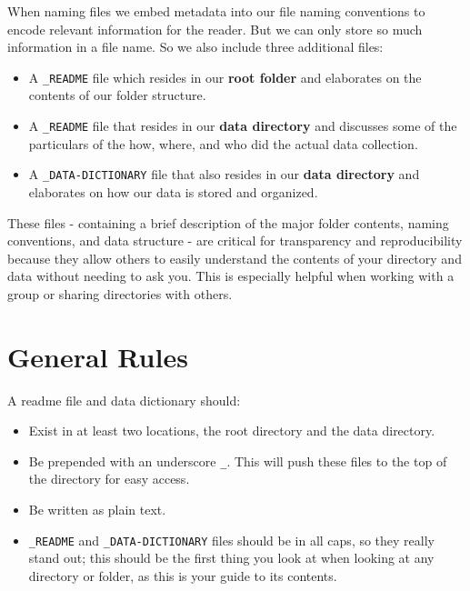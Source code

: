 \documentclass[
]{book}
\providecommand{\tightlist}{%
  \setlength{\itemsep}{0pt}\setlength{\parskip}{0pt}}
\begin{document}
When naming files we embed metadata into our file naming conventions to encode relevant information for the reader. But we can only store so much information in a file name. So we also include three additional files:

\begin{itemize}
\tightlist
\item
  A \texttt{\_README} file which resides in our \textbf{root folder} and elaborates on the contents of our folder structure.
\item
  A \texttt{\_README} file that resides in our \textbf{data directory} and discusses some of the particulars of the how, where, and who did the actual data collection.
\item
  A \texttt{\_DATA-DICTIONARY} file that also resides in our \textbf{data directory} and elaborates on how our data is stored and organized.
\end{itemize}

These files - containing a brief description of the major folder contents, naming conventions, and data structure - are critical for transparency and reproducibility because they allow others to easily understand the contents of your directory and data without needing to ask you. This is especially helpful when working with a group or sharing directories with others.

\hypertarget{general-rules-3}{%
\section*{General Rules}\label{general-rules-3}}

A readme file and data dictionary should:

\begin{itemize}
\tightlist
\item
  Exist in at least two locations, the root directory and the data directory.
\item
  Be prepended with an underscore \texttt{\_}. This will push these files to the top of the directory for easy access.
\item
  Be written as plain text.
\item
  \texttt{\_README} and \texttt{\_DATA-DICTIONARY} files should be in all caps, so they really stand out; this should be the first thing you look at when looking at any directory or folder, as this is your guide to its contents.
\end{itemize}
\end{document}
